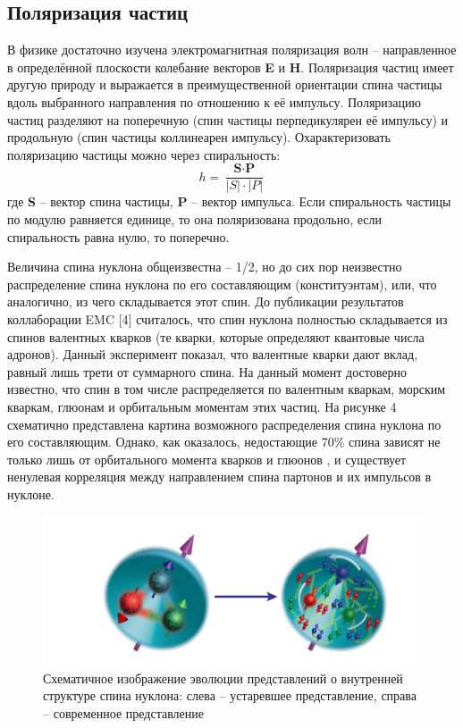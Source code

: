 \documentclass{extarticle}
\begin{document}
\subsection{Поляризация частиц}

 В физике достаточно изучена электромагнитная поляризация волн – направленное в определённой плоскости колебание векторов \textbf{E} и \textbf{H}. Поляризация частиц имеет другую природу и выражается в преимущественной ориентации спина частицы вдоль выбранного направления по отношению к её импульсу. Поляризацию частиц разделяют на поперечную (спин частицы перпедикулярен её импульсу) и продольную (спин частицы коллинеарен импульсу). 
 Охарактеризовать поляризацию частицы можно через спиральность:
 \begin{equation}
     h = \frac{\textbf{S} \cdot \textbf{P}}{|S|\cdot |P|}
 \end{equation}
где \textbf{S} – вектор спина частицы, \textbf{P} – вектор импульса. Если спиральность частицы по модулю равняется единице, то она поляризована продольно, если спиральность равна нулю, то поперечно. 


 Величина спина нуклона общеизвестна – 1/2, но до сих пор неизвестно распределение спина нуклона по его составляющим (конституэнтам), или, что аналогично, из чего складывается этот спин. До публикации результатов коллаборации EMC [4] считалось, что спин нуклона полностью складывается из спинов валентных кварков (те кварки, которые определяют квантовые числа адронов). Данный эксперимент показал, что валентные кварки дают вклад, равный лишь трети от суммарного спина. На данный момент достоверно известно, что спин в том числе распределяется по валентным кваркам, морским кваркам, глюонам и орбитальным моментам этих частиц. На рисунке 4 схематично представлена картина возможного распределения спина нуклона по его составляющим.
 Однако, как оказалось, недостающие 70\% спина зависят не только лишь от орбитального момента кварков и глюонов \cite{Hagler}, и существует ненулевая корреляция между направлением спина партонов и их импульсов в нуклоне. 

\begin{figure}[ht]
    \centering
    \includegraphics[width = 0.9\linewidth]{nucleo.png}
    \caption{Схематичное изображение эволюции представлений о внутренней структуре спина нуклона: слева – устаревшее представление, справа – современное представление}
    \label{fig:nucleo}
\end{figure}
 
\end{document}
